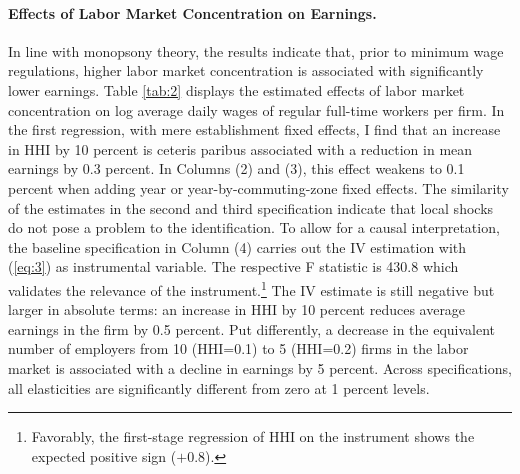 \documentclass[11pt,oneside,reqno,xcolor=dvipsnames]{article} %
\begin{document}
\paragraph{Effects of Labor Market Concentration on Earnings.} In line with monopsony theory, the results indicate that, prior to minimum wage regulations, higher labor market concentration is associated with significantly lower earnings. Table \ref{tab:2} displays the estimated effects of labor market concentration on log average daily wages of regular full-time workers per firm. In the first regression, with mere establishment fixed effects, I find that an increase in HHI by 10 percent is ceteris paribus associated with a reduction in mean earnings by 0.3 percent. In Columns (2) and (3), this effect weakens to 0.1 percent when adding year or year-by-commuting-zone fixed effects. The similarity of the estimates in the second and third specification indicate that local shocks do not pose a problem to the identification. To allow for a causal interpretation, the baseline specification in Column (4) carries out the IV estimation with (\ref{eq:3}) as instrumental variable. The respective F statistic is 430.8 which validates the relevance of the instrument.\footnote{Favorably, the first-stage regression of HHI on the instrument shows the expected positive sign ($\plus$0.8).} The IV estimate is still negative but larger in absolute terms: an increase in HHI by 10 percent reduces average earnings in the firm by 0.5 percent. Put differently, a decrease in the equivalent number of employers from 10 (HHI=0.1) to 5 (HHI=0.2) firms in the labor market is associated with a decline in earnings by 5 percent. Across specifications, all elasticities are significantly different from zero at 1 percent levels.
\end{document}
